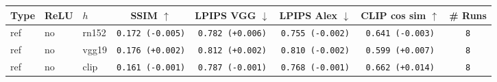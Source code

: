 \begin{tabular}{|l|l|l|c|c|c|c|c|}
\hline
Type & ReLU & $h$ & SSIM $\uparrow$ & LPIPS VGG $\downarrow$ & LPIPS Alex $\downarrow$ & CLIP cos sim $\uparrow$ & \# Runs \\
\hline
ref & no & rn152 & \texttt{0.172 {\color{red}(-0.005)}} & \texttt{0.782 {\color{red}(+0.006)}} & \texttt{0.755 {\color{green}(-0.002)}} & \texttt{0.641 {\color{red}(-0.003)}} & \texttt{8} \\
\hline
ref & no & vgg19 & \texttt{0.176 {\color{green}(+0.002)}} & \texttt{0.812 {\color{red}(+0.002)}} & \texttt{0.810 {\color{green}(-0.002)}} & \texttt{0.599 {\color{green}(+0.007)}} & \texttt{8} \\
\hline
ref & no & clip & \texttt{0.161 {\color{red}(-0.001)}} & \texttt{0.787 {\color{green}(-0.001)}} & \texttt{0.768 {\color{green}(-0.001)}} & \texttt{0.662 {\color{green}(+0.014)}} & \texttt{8} \\
\hline
\end{tabular}
